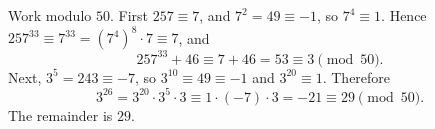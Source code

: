 Work modulo $50$. First $257\equiv7$, and $7^2=49\equiv-1$, so $7^4\equiv1$. Hence $257^{33}\equiv7^{33}=\left(7^4\right)^8\cdot7\equiv7$, and
\[
257^{33}+46\equiv7+46=53\equiv3\pmod{50}.
\]
Next, $3^5=243\equiv-7$, so $3^{10}\equiv49\equiv-1$ and $3^{20}\equiv1$. Therefore
\[
3^{26}=3^{20}\cdot3^5\cdot3\equiv1\cdot(-7)\cdot3=-21\equiv29\pmod{50}.
\]
The remainder is $\boxed{29}$.
